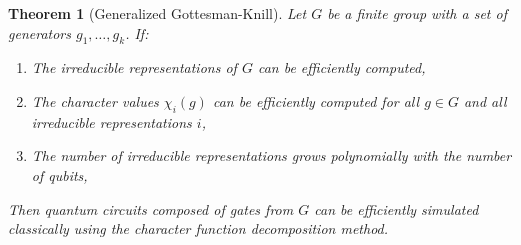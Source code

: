 \documentclass[10pt,a4paper]{amsart}
\newtheorem{theorem}{Theorem}
\begin{document}
\begin{theorem}[Generalized Gottesman-Knill]
Let $G$ be a finite group with a set of generators ${g_1, \ldots, g_k}$. If:
\begin{enumerate}
\item The irreducible representations of $G$ can be efficiently computed,
\item The character values $\chi_i(g)$ can be efficiently computed for all $g \in G$ and all irreducible representations $i$,
\item The number of irreducible representations grows polynomially with the number of qubits,
\end{enumerate}
Then quantum circuits composed of gates from $G$ can be efficiently simulated classically using the character function decomposition method.
\end{theorem}
\end{document}
